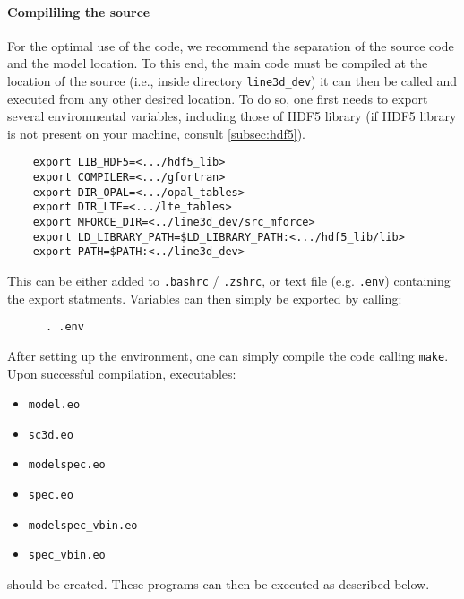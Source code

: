 \documentclass[10pt,a4paper]{article}
\begin{document}
\paragraph{Compililing the source}
\label{compilation}
For the optimal use of the code, we recommend the separation of the source code and the model location. 
To this end, the main code must be compiled at the location of the source (i.e., inside directory \verb|line3d_dev|) 
it can then be called and executed from any other desired location. 
To do so, one first needs to export several environmental variables, 
including those of HDF5 library (if HDF5 library is not present on your machine, consult \ref{subsec:hdf5}). \\

  \begin{verbatim}
    export LIB_HDF5=<.../hdf5_lib>
    export COMPILER=<.../gfortran>
    export DIR_OPAL=<.../opal_tables>
    export DIR_LTE=<.../lte_tables>
    export MFORCE_DIR=<../line3d_dev/src_mforce>
    export LD_LIBRARY_PATH=$LD_LIBRARY_PATH:<.../hdf5_lib/lib>
    export PATH=$PATH:<../line3d_dev>
  \end{verbatim}
  This can be either added to \texttt{.bashrc} / \texttt{.zshrc}, or text file (e.g. \texttt{.env}) containing the export statments.
  Variables can then simply be exported by calling:
  \begin{verbatim}
      . .env
  \end{verbatim}
% 

After setting up the environment, one can simply compile the code calling \texttt{make}.
Upon successful compilation, executables:
\begin{itemize}
  \item \texttt{model.eo}
  \item \texttt{sc3d.eo}
  \item \texttt{modelspec.eo}
  \item \texttt{spec.eo}
  \item \texttt{modelspec\_vbin.eo}
  \item \texttt{spec\_vbin.eo} 
\end{itemize}
  should be created.
These programs can then be executed as described below.
\end{document}
